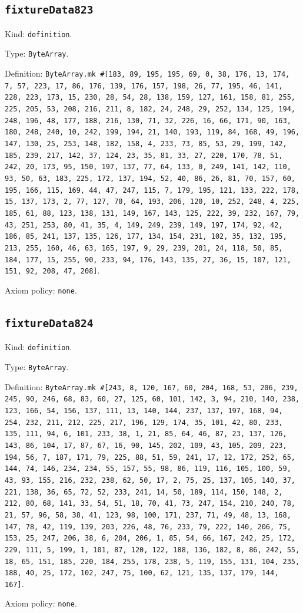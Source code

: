 \documentclass[11pt]{article}
\begin{document}
\subsection*{\texttt{fixtureData823}}
\noindent Kind: \texttt{definition}.\par
\noindent Type: \texttt{ByteArray}.\par
\noindent Definition: \texttt{ByteArray.mk \#[183, 89, 195, 195, 69, 0, 38, 176, 13, 174, 7, 57, 223, 17, 86, 176, 139, 176, 157, 198, 26, 77, 195, 46, 141, 228, 223, 173, 15, 230, 28, 54, 28, 138, 159, 127, 161, 158, 81, 255, 225, 205, 53, 208, 216, 211, 8, 182, 24, 248, 29, 252, 134, 125, 194, 248, 196, 48, 177, 188, 216, 130, 71, 32, 226, 16, 66, 171, 90, 163, 180, 248, 240, 10, 242, 199, 194, 21, 140, 193, 119, 84, 168, 49, 196, 147, 130, 25, 253, 148, 182, 158, 4, 233, 73, 85, 53, 29, 199, 142, 185, 239, 217, 142, 37, 124, 23, 35, 81, 33, 27, 220, 170, 78, 51, 242, 20, 173, 95, 150, 197, 137, 77, 64, 133, 0, 249, 141, 142, 110, 93, 50, 63, 183, 225, 172, 137, 194, 52, 40, 86, 26, 81, 70, 157, 60, 195, 166, 115, 169, 44, 47, 247, 115, 7, 179, 195, 121, 133, 222, 178, 15, 137, 173, 2, 77, 127, 70, 64, 193, 206, 120, 10, 252, 248, 4, 225, 185, 61, 88, 123, 138, 131, 149, 167, 143, 125, 222, 39, 232, 167, 79, 43, 251, 253, 80, 41, 35, 4, 149, 249, 239, 149, 197, 174, 92, 42, 186, 85, 241, 137, 135, 126, 177, 134, 154, 231, 102, 35, 132, 195, 213, 255, 160, 46, 63, 165, 197, 9, 29, 239, 201, 24, 118, 50, 85, 184, 177, 15, 255, 90, 233, 94, 176, 143, 135, 27, 36, 15, 107, 121, 151, 92, 208, 47, 208]}.\par
\noindent Axiom policy: \texttt{none}.\par
\subsection*{\texttt{fixtureData824}}
\noindent Kind: \texttt{definition}.\par
\noindent Type: \texttt{ByteArray}.\par
\noindent Definition: \texttt{ByteArray.mk \#[243, 8, 120, 167, 60, 204, 168, 53, 206, 239, 245, 90, 246, 68, 83, 60, 27, 125, 60, 101, 142, 3, 94, 210, 140, 238, 123, 166, 54, 156, 137, 111, 13, 140, 144, 237, 137, 197, 168, 94, 254, 232, 211, 212, 225, 217, 196, 129, 174, 35, 101, 42, 80, 233, 135, 111, 94, 6, 101, 233, 38, 1, 21, 85, 64, 46, 87, 23, 137, 126, 143, 86, 104, 17, 87, 67, 16, 90, 145, 202, 109, 43, 105, 209, 223, 194, 56, 7, 187, 171, 79, 225, 88, 51, 59, 241, 17, 12, 172, 252, 65, 144, 74, 146, 234, 234, 55, 157, 55, 98, 86, 119, 116, 105, 100, 59, 43, 93, 155, 216, 232, 238, 62, 50, 17, 2, 75, 25, 137, 105, 140, 37, 221, 138, 36, 65, 72, 52, 233, 241, 14, 50, 189, 114, 150, 148, 2, 212, 80, 68, 141, 33, 54, 51, 18, 70, 41, 73, 247, 154, 210, 240, 78, 21, 57, 96, 58, 38, 41, 123, 98, 100, 171, 237, 71, 49, 48, 13, 168, 147, 78, 42, 119, 139, 203, 226, 48, 76, 233, 79, 222, 140, 206, 75, 153, 25, 247, 206, 38, 6, 204, 206, 1, 85, 54, 66, 167, 242, 25, 172, 229, 111, 5, 199, 1, 101, 87, 120, 122, 188, 136, 182, 8, 86, 242, 55, 18, 65, 151, 185, 220, 184, 255, 178, 238, 5, 119, 155, 131, 104, 235, 188, 40, 25, 172, 102, 247, 75, 100, 62, 121, 135, 137, 179, 144, 167]}.\par
\noindent Axiom policy: \texttt{none}.\par
\end{document}
